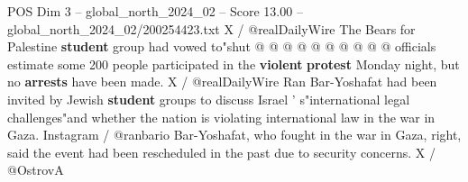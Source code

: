 \begin{textsample}{POS Dim 3 – global\_north\_2024\_02 – Score 13.00 – global\_north\_2024\_02/200254423.txt}
X / @realDailyWire The Bears for Palestine \textbf{student} group had vowed to"shut @ @ @ @ @ @ @ @ @ @ officials estimate some 200 people participated in the \textbf{violent} \textbf{protest} Monday night, but no \textbf{arrests} have been made.
X / @realDailyWire Ran Bar-Yoshafat had been invited by Jewish \textbf{student} groups to discuss Israel ' s"international legal challenges"and whether the nation is violating international law in the war in Gaza.
Instagram / @ranbario Bar-Yoshafat, who fought in the war in Gaza, right, said the event had been rescheduled in the past due to security concerns.
X / @OstrovA

\end{textsample}
